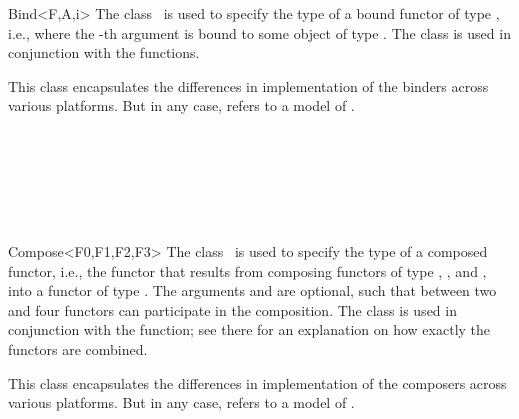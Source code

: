 \begin{ccRefClass}{Bind<F,A,i>}
  \ccDefinition The class \ccRefName\ is used to specify the type of a
  bound functor of type , i.e., where the -th argument is
  bound to some object of type . The class is used in
  conjunction with the  functions.


  \ccTypes
  
   This class encapsulates the differences in
  implementation of the binders across various platforms. But in any
  case,  refers to a model of .

  \ccSeeAlso
  \\
  \\
  \\
  \\
  \\ 
  
\end{ccRefClass}

\begin{ccRefClass}{Compose<F0,F1,F2,F3>}
  \ccDefinition The class \ccRefName\ is used to specify the type of a
  composed functor, i.e., the functor that results from composing
  functors of type , , and , into a functor of
  type . The arguments  and  are optional,
  such that between two and four functors can participate in the
  composition. The class is used in conjunction with the 
  function; see there for an explanation on how exactly the functors
  are combined.

  
  \ccTypes
  
   This class encapsulates the differences in
  implementation of the composers across various platforms. But in any
  case,  refers to a model of .

  \ccSeeAlso
  \\
  
\end{ccRefClass}

